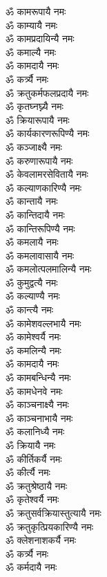 \begin{flushleft}
\begin{multicols}{2}
ॐ कामरूपायै नमः\\
ॐ काम्यायै नमः\\
ॐ कामप्रदायिन्यै नमः\hfill{}\\
ॐ कमाल्यै नमः\\
ॐ कामदायै नमः\\
ॐ कर्त्र्यै नमः\\
ॐ क्रतुकर्मफलप्रदायै नमः\\
ॐ कृतघ्नघ्न्यै नमः\\
ॐ क्रियारूपायै नमः\\
ॐ कार्यकारणरूपिण्यै नमः\\
ॐ कञ्जाक्ष्यै नमः\\
ॐ करुणारूपायै नमः\\
ॐ केवलामरसेवितायै नमः\hfill{}\\
ॐ कल्याणकारिण्यै नमः\\
ॐ कान्तायै नमः\\
ॐ कान्तिदायै नमः\\
ॐ कान्तिरूपिण्यै नमः\\
ॐ कमलायै नमः\\
ॐ कमलावासायै नमः\\
ॐ कमलोत्पलमालिन्यै नमः\\
ॐ कुमुद्वत्यै नमः\\
ॐ कल्याण्यै नमः\\
ॐ कान्त्यै नमः\hfill{}\\
ॐ कामेशवल्लभायै नमः\\
ॐ कामेश्वर्यै नमः\\
ॐ कमलिन्यै नमः\\
ॐ कामदायै नमः\\
ॐ कामबन्धिन्यै नमः\\
ॐ कामधेनवे नमः\\
ॐ काञ्चनाक्ष्यै नमः\\
ॐ काञ्चनाभायै नमः\\
ॐ कलानिध्यै नमः\\
ॐ क्रियायै नमः\hfill{}\\
ॐ कीर्तिकर्यै नमः\\
ॐ कीर्त्यै नमः\\
ॐ क्रतुश्रेष्ठायै नमः\\
ॐ कृतेश्वर्यै नमः\\
ॐ क्रतुसर्वक्रियास्तुत्यायै नमः\\
ॐ क्रतुकृत्प्रियकारिण्यै नमः\\
ॐ क्लेशनाशकर्यै नमः\\
ॐ कर्त्र्यै नमः\\
ॐ कर्मदायै नमः\\

\end{multicols}
\end{flushleft}
